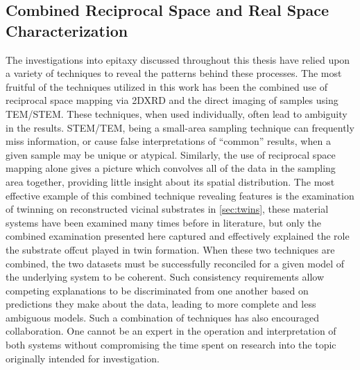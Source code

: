 \subsection{Combined Reciprocal Space and Real Space Characterization} The investigations into epitaxy discussed throughout this thesis have relied upon a variety of techniques to reveal the patterns behind these processes.
The most fruitful of the techniques utilized in this work has been the combined use of reciprocal space mapping via 2DXRD and the direct imaging of samples using TEM/STEM\@. These techniques, when used individually, often lead to ambiguity in the results.
STEM/TEM, being a small-area sampling technique can frequently miss information, or cause false interpretations of ``common'' results, when a given sample may be unique or atypical.
Similarly, the use of reciprocal space mapping alone gives a picture which convolves all of the data in the sampling area together, providing little insight about its spatial distribution.
The most effective example of this combined technique revealing features is the examination of twinning on reconstructed vicinal substrates in \cref{sec:twins}, these material systems have been examined many times before in literature, but only the combined examination presented here captured and effectively explained the role the substrate offcut played in twin formation.
When these two techniques are combined, the two datasets must be successfully reconciled for a given model of the underlying system to be coherent.
Such consistency requirements allow competing explanations to be discriminated from one another based on predictions they make about the data, leading to more complete and less ambiguous models.
Such a combination of techniques has also encouraged collaboration.
One cannot be an expert in the operation and interpretation of both systems without compromising the time spent on research into the topic originally intended for investigation.
